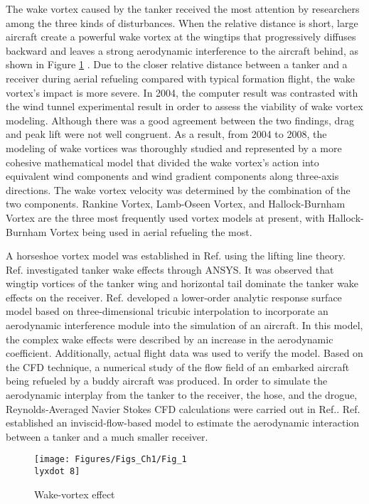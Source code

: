 The wake vortex caused by the tanker received the most attention by
researchers among the three kinds of disturbances. When the relative
distance is short, large aircraft create a powerful wake vortex at
the wingtips that progressively diffuses backward and leaves a strong
aerodynamic interference to the aircraft behind, as shown in Figure
\ref{Fig_1.8} . Due to the closer relative distance between a tanker
and a receiver during aerial refueling compared with typical formation
flight, the wake vortex's impact is more severe\cite{venkataramanan2003vortex}.
In 2004, the computer result was contrasted with the wind tunnel experimental
result in order to assess the viability of wake vortex modeling\cite{blake2004uav}.
Although there was a good agreement between the two findings, drag
and peak lift were not well congruent. As a result, from 2004 to 2008,
the modeling of wake vortices was thoroughly studied\cite{dogan2008wakeA}
\cite{dogan2008wakeB} and represented by a more cohesive mathematical
model that divided the wake vortex's action into equivalent wind components
and wind gradient components along three-axis directions. The wake
vortex velocity was determined by the combination of the two components.
Rankine Vortex, Lamb-Oseen Vortex, and Hallock-Burnham Vortex are
the three most frequently used vortex models at present\cite{gerz2002commercial},
with Hallock-Burnham Vortex being used in aerial refueling the most.

A horseshoe vortex model was established in Ref.\cite{Vortex-1} using
the lifting line theory. Ref.\cite{zhang2020tanker} investigated
tanker wake effects through ANSYS. It was observed that wingtip vortices
of the tanker wing and horizontal tail dominate the tanker wake effects
on the receiver. Ref.\cite{cavallo2019low} developed a lower-order
analytic response surface model based on three-dimensional tricubic
interpolation to incorporate an aerodynamic interference module into
the simulation of an aircraft. In this model, the complex wake effects
were described by an increase in the aerodynamic coefficient. Additionally,
actual flight data was used to verify the model. Based on the CFD
technique\cite{yue2016numerical}, a numerical study of the flow field
of an embarked aircraft being refueled by a buddy aircraft was produced.
In order to simulate the aerodynamic interplay from the tanker to
the receiver, the hose, and the drogue, Reynolds-Averaged Navier Stokes
CFD calculations were carried out in Ref.\cite{fezans2018towards}.
Ref.\cite{katz2017aerodynamic} established an inviscid-flow-based
model to estimate the aerodynamic interaction between a tanker and
a much smaller receiver.
\begin{figure}
\begin{centering}
\texttt{[image: Figures/Figs\_Ch1/Fig\_1\\lyxdot 8]}
\par\end{centering}
\caption{Wake-vortex effect \cite{Vortex-1}}

\centering{}\label{Fig_1.8}
\end{figure}


